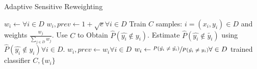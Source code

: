 \documentclass[runningheads]{llncs}
\begin{document}
\begin{algorithm}
\caption{Adaptive Sensitive Reweighting}\label{euclid}
\begin{algorithmic}[1]
\State $w_i \leftarrow \forall i \in D$
\State $w_i,prev \leftarrow 1 + \sqrt{e} \forall i \in D$
\State Train $C$ samples: $i = (x_i,y_i) \in D$ and weights $\frac{w_j}{\sum_{j \in D}{w_j}}$.
\State Use $C$ to Obtain $\hat{P}(\hat{y_i} \notin y_i)$.
\State Estimate $\hat{P}(\hat{y_i} \notin \tilde{y_i})$ using $\hat{P}(\hat{y_i} \notin y_i) \forall i \in D$.
\State $w_i,prev \leftarrow w_i \forall i \in D$
\State $w_i \leftarrow \sfrac{P(\hat{y_i} \neq \tilde{y_i})}{P(\hat{y_i} \neq y_i)} \forall \in D$
\EndWhile
\Return trained classifier $C, \{w_i\}$
\EndFunction
\end{algorithmic}
\end{algorithm}
\end{document}
